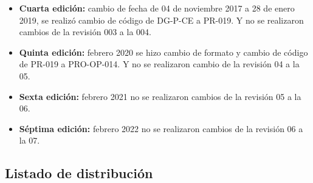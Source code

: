 \begin{itemize}
	\item \textbf{Cuarta edición:} cambio de fecha de 04 de noviembre 2017 a 28 de enero 2019, se realizó cambio de código de DG-P-CE a PR-019. Y no se realizaron cambios de la revisión 003 a la 004.
	\item \textbf{Quinta edición:} febrero 2020 se hizo cambio de formato y cambio de código de PR-019 a PRO-OP-014. Y no se realizaron cambio de la revisión 04 a la 05.
	\item \textbf{Sexta edición:} febrero 2021 no se realizaron cambios de la revisión 05 a la 06.
	\item \textbf{Séptima edición:} febrero 2022 no se realizaron cambios de la revisión 06 a la 07.
\end{itemize}

\subsection{Listado de distribución}

